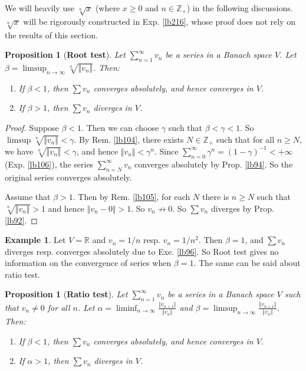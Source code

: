 \documentclass[12pt,b5paper,notitlepage]{article}
\theoremstyle{definition}
\newtheorem{eg}[df]{Example}
\theoremstyle{plain}
\newtheorem{pp}[df]{Proposition}
\newcommand{\Zbb}{\mathbb Z}
\newcommand{\Rbb}{\mathbb R}
\newcommand{\dps}{\displaystyle}
\numberwithin{equation}{section}
\begin{document}
We will heavily use $\sqrt[n]{x}$ (where $x\geq0$ and $n\in\Zbb_+$) in the following discussions. $\sqrt[n]{x}$ will be rigorously constructed in Exp. \ref{lb216}, whose proof does not rely on the results of this section.


\begin{pp}[\textbf{Root test}] 
Let $\dps\sum_{n=1}^\infty v_n$ be a series in a Banach space $V$. Let $\dps\beta=\limsup_{n\rightarrow\infty}\sqrt[n]{\Vert v_n\Vert}$. Then:
\begin{enumerate}
\item If $\beta<1$, then $\sum v_n$ converges absolutely, and hence converges in $V$.
\item If $\beta>1$, then $\sum v_n$ diverges in $V$.
\end{enumerate}
\end{pp}


\begin{proof}
Suppose $\beta<1$. Then we can choose $\gamma$ such that $\beta<\gamma<1$. So $\limsup \sqrt[n]{\Vert v_n\Vert}<\gamma$. By Rem. \ref{lb104}, there exists $N\in\Zbb_+$ such that for all $n\geq N$, we have $\sqrt[n]{\Vert v_n\Vert}<\gamma$, and hence $\Vert v_n\Vert <\gamma^n$. Since $\sum_{n=0}^\infty \gamma^n=(1-\gamma)^{-1}<+\infty$ (Exp. \ref{lb106}), the series $\sum_{n=N}^\infty v_n$ converges absolutely by Prop. \ref{lb94}. So the original series converges absolutely.

Assume that $\beta>1$. Then by Rem. \ref{lb105}, for each $N$ there is $n\geq N$ such that $\sqrt[n]{\Vert v_n\Vert}>1$ and hence $\Vert v_n-0\Vert>1$. So $v_n\nrightarrow 0$. So $\sum v_n$ diverges by Prop. \ref{lb92}.
\end{proof}

\begin{eg}
Let $V=\Rbb$ and $v_n=1/n$ resp. $v_n=1/n^2$. Then $\beta=1$, and $\sum v_n$ diverges resp. converges absolutely due to Exe. \ref{lb96}. So Root test gives no information on the convergence of series when $\beta=1$. The same can be said about ratio test.
\end{eg}




\begin{pp}[\textbf{Ratio test}]  
Let $\dps\sum_{n=1}^\infty v_n$ be a series in a Banach space $V$ such that $v_n\neq 0$ for all $n$. Let $\dps\alpha=\liminf_{n\rightarrow\infty}\frac{\Vert v_{n+1}\Vert}{\Vert v_n\Vert}$ and $\dps\beta=\limsup_{n\rightarrow\infty}\frac{\Vert v_{n+1}\Vert}{\Vert v_n\Vert}$. Then:
\begin{enumerate}
\item If $\beta<1$, then $\sum v_n$ converges absolutely, and hence converges in $V$.
\item If $\alpha>1$, then $\sum v_n$ diverges in $V$.
\end{enumerate}
\end{pp}
\end{document}
